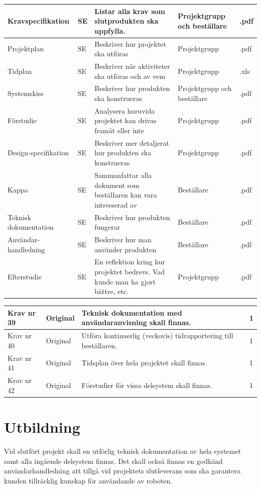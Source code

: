 \documentclass[11pt]{article}
\begin{document}
\begin{flushleft}
\begin{center}
\begin{longtable}{|p{.24\linewidth}|p{.08\linewidth}|p{.25\linewidth}|p{.19\linewidth}|p{.1\linewidth}|}
Kravspecifikation & SE & Listar alla krav som slutprodukten ska uppfylla. & Projektgrupp och beställare & .pdf \\ \hline
Projektplan & SE & Beskriver hur projektet ska utföras & Projektgrupp & .pdf \\ \hline
Tidplan & SE & Beskriver när aktiviteter ska utföras och av vem & Projektgrupp & .xls \\ \hline
Systemskiss & SE & Beskriver hur produkten ska konstrueras& Projektgrupp och beställare & .pdf \\ \hline
Förstudie & SE & Analysera huruvida projektet kan drivas framåt eller inte & Projektgrupp & .pdf \\ \hline
Design-specifikation & SE & Beskriver mer detaljerat hur produkten ska konstrueras & Projektgrupp & .pdf \\ \hline
Kappa & SE & Sammanfattar alla dokument som beställaren kan vara intresserad av & Beställare & .pdf \\ \hline
Teknisk dokumentation & SE & Beskriver hur produkten fungerar & Beställare & .pdf \\ \hline
Användar-handledning & SE & Beskriver hur man använder produkten& Beställare & .pdf \\ \hline
Efterstudie & SE & En reflektion kring hur projektet bedrevs. Vad kunde man ha gjort bättre, etc.& Projektgrupp & .pdf \\ \hline

\end{longtable}
\end{center}

\begin{center}
\begin{longtable}{|l|l|p{.70\linewidth}|l|} \hline
Krav nr 39 & 
Original & 
Teknisk dokumentation med användaranvisning skall finnas. &
1 \\ \hline

Krav nr 40 &
Original &
Utföra kontinuerlig (veckovis) tidrapportering till beställaren. &
1 \\ \hline

Krav nr 41 &
Original &
Tidsplan över hela projektet skall finnas. &
1 \\ \hline

Krav nr 42 &
Original &
Förstudier för vissa delsystem skall finnas. &
1 \\ \hline
\end{longtable}
\end{center}

\section{Utbildning}
Vid slutfört projekt skall en utförlig teknisk dokumentation av hela systemet samt alla ingående delsystem finnas. Det skall också finnas en godkänd användarhandledning att tillgå vid projektets slutleverans som ska garantera kunden tillräcklig kunskap för användande av roboten.



\end{flushleft}
\end{document}
